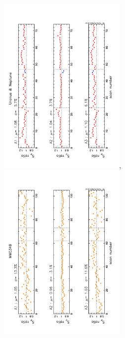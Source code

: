 \begin{figure}[ht!]
  \begin{center}
    \includegraphics[clip=true,angle=-90.,width=0.55\textwidth]{Figures/Aperture_photo/Ura_Nept_Flux_ratio_index_A1_A2_A3.pdf},\includegraphics[clip=true,angle=-90.,width=0.55\textwidth]{Figures/Aperture_photo/MWC349_Flux_ratio_index_A1_A2_A3.pdf}

\end{center}
\end{figure}
